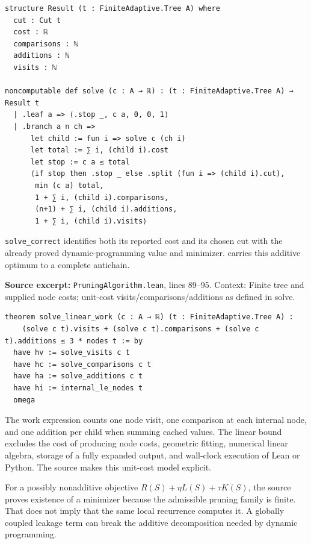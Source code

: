 \documentclass[11pt]{article}
\begin{document}
\begin{minipage}{\linewidth}
\begin{lstlisting}
structure Result (t : FiniteAdaptive.Tree A) where
  cut : Cut t
  cost : ℝ
  comparisons : ℕ
  additions : ℕ
  visits : ℕ

noncomputable def solve (c : A → ℝ) : (t : FiniteAdaptive.Tree A) → Result t
  | .leaf a => ⟨.stop _, c a, 0, 0, 1⟩
  | .branch a n ch =>
      let child := fun i => solve c (ch i)
      let total := ∑ i, (child i).cost
      let stop := c a ≤ total
      ⟨if stop then .stop _ else .split (fun i => (child i).cut),
       min (c a) total,
       1 + ∑ i, (child i).comparisons,
       (n+1) + ∑ i, (child i).additions,
       1 + ∑ i, (child i).visits⟩
\end{lstlisting}
\end{minipage}\par

\texttt{solve\_correct} identifies both its reported cost and its chosen cut with the already proved dynamic-programming value and minimizer. \texttt{} carries this additive optimum to a complete antichain.

\textbf{Source excerpt:} \texttt{PruningAlgorithm.lean}, lines 89--95. Context: Finite tree and supplied node costs; unit-cost visits/comparisons/additions as defined in solve.

\begin{minipage}{\linewidth}
\begin{lstlisting}
theorem solve_linear_work (c : A → ℝ) (t : FiniteAdaptive.Tree A) :
    (solve c t).visits + (solve c t).comparisons + (solve c t).additions ≤ 3 * nodes t := by
  have hv := solve_visits c t
  have hc := solve_comparisons c t
  have ha := solve_additions c t
  have hi := internal_le_nodes t
  omega
\end{lstlisting}
\end{minipage}\par

The work expression counts one node visit, one comparison at each internal node, and one addition per child when summing cached values. The linear bound excludes the cost of producing node costs, geometric fitting, numerical linear algebra, storage of a fully expanded output, and wall-clock execution of Lean or Python. The source makes this unit-cost model explicit.

For a possibly nonadditive objective \(R(S)+\eta L(S)+\tau K(S)\), the source proves existence of a minimizer because the admissible pruning family is finite. That does not imply that the same local recurrence computes it. A globally coupled leakage term can break the additive decomposition needed by dynamic programming.
\end{document}
